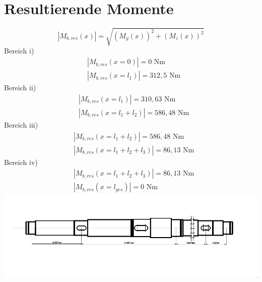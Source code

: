 \section{Resultierende Momente}
\[
	|M_{b,res}(x)| = \sqrt{\left( M_{y}(x) \right)^2 + \left( M_{z}(x) \right)^2 }
\]
Bereich i)
\begin{align*}
	&|M_{b,res}(x=0)| = 0 \text{ Nm} \\
	&|M_{b,res}(x=l_1)| = 312,5 \text{ Nm} 
\end{align*}
Bereich ii)
\begin{align*}
	&|M_{b,res}(x=l_1)| = 310,63 \text{ Nm} \\
	&|M_{b,res}(x=l_1+l_2)| = 586,48 \text{ Nm} 
\end{align*}
Bereich iii)
\begin{align*}
	&|M_{b,res}(x=l_1+l_2)| = 586,48 \text{ Nm} \\
	&|M_{b,res}(x=l_1+l_2+l_3)| = 86,13 \text{ Nm} 
\end{align*}
Bereich iv)
\begin{align*}
	&|M_{b,res}(x=l_1+l_2+l_3)| = 86,13 \text{ Nm} \\
	&|M_{b,res}(x=l_{ges})| = 0 \text{ Nm} 
\end{align*}
\includegraphics[width=\textwidth,keepaspectratio]{figures/Welleklein.png}